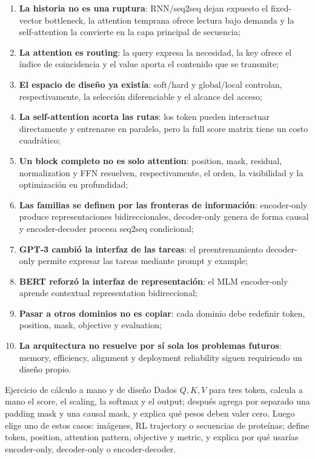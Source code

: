 \documentclass[a4paper]{article}
\begin{document}
\begin{enumerate}
  \item \textbf{La historia no es una ruptura}: RNN/seq2seq dejan expuesto el fixed-vector bottleneck, la attention temprana ofrece lectura bajo demanda y la self-attention la convierte en la capa principal de secuencia;
  \item \textbf{La attention es routing}: la query expresa la necesidad, la key ofrece el índice de coincidencia y el value aporta el contenido que se transmite;
  \item \textbf{El espacio de diseño ya existía}: soft/hard y global/local controlan, respectivamente, la selección diferenciable y el alcance del acceso;
  \item \textbf{La self-attention acorta las rutas}: los token pueden interactuar directamente y entrenarse en paralelo, pero la full score matrix tiene un costo cuadrático;
  \item \textbf{Un block completo no es solo attention}: position, mask, residual, normalization y FFN resuelven, respectivamente, el orden, la visibilidad y la optimización en profundidad;
  \item \textbf{Las familias se definen por las fronteras de información}: encoder-only produce representaciones bidireccionales, decoder-only genera de forma causal y encoder-decoder procesa seq2seq condicional;
  \item \textbf{GPT-3 cambió la interfaz de las tareas}: el preentrenamiento decoder-only permite expresar las tareas mediante prompt y example;
  \item \textbf{BERT reforzó la interfaz de representación}: el MLM encoder-only aprende contextual representation bidireccional;
  \item \textbf{Pasar a otros dominios no es copiar}: cada dominio debe redefinir token, position, mask, objective y evaluation;
  \item \textbf{La arquitectura no resuelve por sí sola los problemas futuros}: memory, efficiency, alignment y deployment reliability siguen requiriendo un diseño propio.
\end{enumerate}

\begin{importantbox}{Ejercicio de cálculo a mano y de diseño}
Dados $Q,K,V$ para tres token, calcula a mano el score, el scaling, la softmax y el output; después agrega por separado una padding mask y una causal mask, y explica qué pesos deben valer cero. Luego elige uno de estos casos: imágenes, RL trajectory o secuencias de proteínas; define token, position, attention pattern, objective y metric, y explica por qué usarías encoder-only, decoder-only o encoder-decoder.
\end{importantbox}
\end{document}
